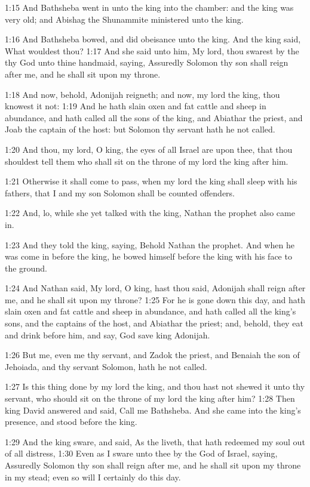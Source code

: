 1:15 And Bathsheba went in unto the king into the chamber: and the king was very old; and Abishag the Shunammite ministered unto the king.

1:16 And Bathsheba bowed, and did obeisance unto the king. And the king said, What wouldest thou?  1:17 And she said unto him, My lord, thou swarest by the \LORD thy God unto thine handmaid, saying, Assuredly Solomon thy son shall reign after me, and he shall sit upon my throne.

1:18 And now, behold, Adonijah reigneth; and now, my lord the king, thou knowest it not: 1:19 And he hath slain oxen and fat cattle and sheep in abundance, and hath called all the sons of the king, and Abiathar the priest, and Joab the captain of the host: but Solomon thy servant hath he not called.

1:20 And thou, my lord, O king, the eyes of all Israel are upon thee, that thou shouldest tell them who shall sit on the throne of my lord the king after him.

1:21 Otherwise it shall come to pass, when my lord the king shall sleep with his fathers, that I and my son Solomon shall be counted offenders.

1:22 And, lo, while she yet talked with the king, Nathan the prophet also came in.

1:23 And they told the king, saying, Behold Nathan the prophet. And when he was come in before the king, he bowed himself before the king with his face to the ground.

1:24 And Nathan said, My lord, O king, hast thou said, Adonijah shall reign after me, and he shall sit upon my throne?  1:25 For he is gone down this day, and hath slain oxen and fat cattle and sheep in abundance, and hath called all the king's sons, and the captains of the host, and Abiathar the priest; and, behold, they eat and drink before him, and say, God save king Adonijah.

1:26 But me, even me thy servant, and Zadok the priest, and Benaiah the son of Jehoiada, and thy servant Solomon, hath he not called.

1:27 Is this thing done by my lord the king, and thou hast not shewed it unto thy servant, who should sit on the throne of my lord the king after him?  1:28 Then king David answered and said, Call me Bathsheba.  And she came into the king's presence, and stood before the king.

1:29 And the king sware, and said, As the \LORD liveth, that hath redeemed my soul out of all distress, 1:30 Even as I sware unto thee by the \LORD God of Israel, saying, Assuredly Solomon thy son shall reign after me, and he shall sit upon my throne in my stead; even so will I certainly do this day.

